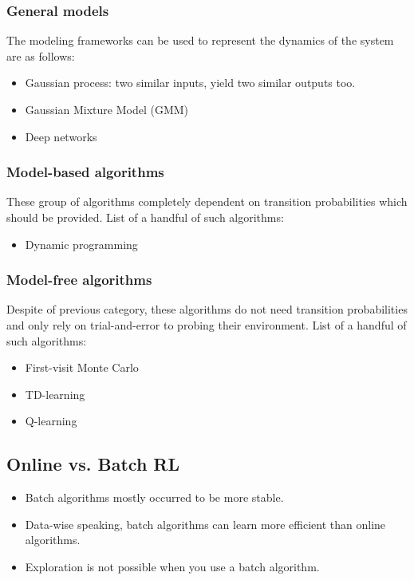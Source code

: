 \documentclass[letterpaper,12pt]{article}
\begin{document}
\subsubsection{General models}
The modeling frameworks can be used to represent the dynamics of the system are as follows:
\begin{itemize}
    \item Gaussian process: two similar inputs, yield two similar outputs too.
    \item Gaussian Mixture Model (GMM)
    \item Deep networks
\end{itemize}

\subsubsection{Model-based algorithms}
These group of algorithms completely dependent on transition probabilities which should be provided. List of a handful of such algorithms:
\begin{itemize}
    \item Dynamic programming
\end{itemize}

\subsubsection{Model-free algorithms}
Despite of previous category, these algorithms do not need transition probabilities and only rely on trial-and-error to probing their environment. List of a handful of such algorithms:
\begin{itemize}
    \item First-visit Monte Carlo
    \item TD-learning
    \item Q-learning
\end{itemize}

\subsection{Online vs. Batch RL}
\begin{itemize}
    \item Batch algorithms mostly occurred to be more stable.
    \item Data-wise speaking, batch algorithms can learn more efficient than online algorithms.
    \item Exploration is not possible when you use a batch algorithm.
\end{itemize}
\end{document}
